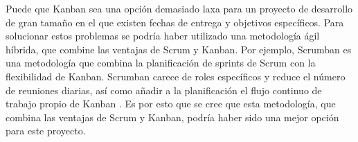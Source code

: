 Puede que Kanban sea una opción demasiado laxa para un proyecto de desarrollo de gran tamaño en el
que existen fechas de entrega y objetivos específicos. Para solucionar estos problemas se podría
haber utilizado una metodología ágil híbrida, que combine las ventajas de Scrum y Kanban. Por ejemplo,
Scrumban es una metodología que combina la planificación de sprints de Scrum con la flexibilidad
de Kanban. Scrumban carece de roles específicos y reduce el número de reuniones diarias, así como
añadir a la planificación el flujo continuo de trabajo propio de Kanban \parencites{Stoica2016AnalyzingAD}%
{Scrumban}. Es por esto que se cree que esta metodología, que combina las ventajas de Scrum y Kanban,
podría haber sido  una mejor opción para este proyecto.

